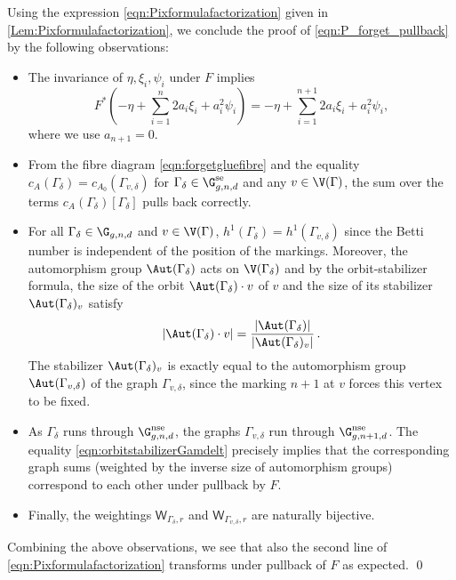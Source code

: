 Using the expression \eqref{eqn:Pixformulafactorization} given in \cref{Lem:Pixformulafactorization}, we conclude the proof of \eqref{eqn:P_forget_pullback} by the following observations:
\begin{itemize}
    \item The invariance of $\eta, \xi_i, \psi_i$ under $F$ implies
    \[F^*(-\eta + \sum_{i=1}^n 2 a_i \xi_i+ a_i^2 \psi_i ) = -\eta + \sum_{i=1}^{n+1} 2 a_i \xi_i+ a_i^2 \psi_i, \]
    where we use $a_{n+1}=0$.
    \item From the fibre diagram \eqref{eqn:forgetgluefibre} and the equality $c_{A}(\Gamma_\delta) = c_{A_0}(\Gamma_{v,\delta})$ for $\Gamma_\delta \in \G_{g,n,d}^\textup{se}$ and any $v \in \V(\Gamma)$, the sum over the terms $c_A(\Gamma_\delta) [\Gamma_\delta]$ pulls back correctly.
    \item For all $\Gamma_\delta \in \G_{g,n,d}$ and $v \in \V(\Gamma)$, $h^1(\Gamma_\delta) = h^1(\Gamma_{v,\delta})$ since the Betti number is independent of the position of the markings. Moreover, the automorphism group $\Aut(\Gamma_\delta)$ acts on $\V(\Gamma_\delta)$ and by the orbit-stabilizer formula, the size of the orbit  $\Aut(\Gamma_\delta) \cdot v$ of $v$ and the size of its stabilizer $\Aut(\Gamma_\delta)_v$ satisfy
    \begin{equation} \label{eqn:orbitstabilizerGamdelt}|\Aut(\Gamma_\delta) \cdot v| = \frac{|\Aut(\Gamma_\delta)|}{|\Aut(\Gamma_\delta)_v|}\, .\end{equation}
    The stabilizer $\Aut(\Gamma_\delta)_v$ is exactly equal to the automorphism group $\Aut(\Gamma_{v,\delta})$ of the graph $\Gamma_{v,\delta}$, since the marking $n+1$ at $v$ forces this vertex to be fixed.
    \item As $\Gamma_\delta$ runs through $\G_{g,n,d}^\textup{nse}$, the graphs $\Gamma_{v,\delta}$ run through $\G_{g,n+1,d}^\textup{nse}$. The equality \eqref{eqn:orbitstabilizerGamdelt} precisely implies that the corresponding graph sums (weighted by the inverse size of automorphism groups) correspond to each other under pullback by $F$.
    \item Finally, the weightings $\mathsf{W}_{\Gamma_\delta,r}$ and $\mathsf{W}_{\Gamma_{v,\delta},r}$ are naturally bijective.
\end{itemize}
Combining the above observations, we see that also the second line of \eqref{eqn:Pixformulafactorization} transforms under pullback of $F$ as expected. \qed






